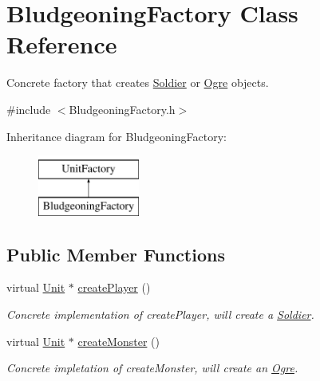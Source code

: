 \hypertarget{class_bludgeoning_factory}{}\section{Bludgeoning\+Factory Class Reference}
\label{class_bludgeoning_factory}


Concrete factory that creates \hyperlink{class_soldier}{Soldier} or \hyperlink{class_ogre}{Ogre} objects.  




{\ttfamily \#include $<$Bludgeoning\+Factory.\+h$>$}

Inheritance diagram for Bludgeoning\+Factory\+:\begin{figure}[H]
\begin{center}
\leavevmode
\includegraphics[height=2.000000cm]{class_bludgeoning_factory}
\end{center}
\end{figure}
\subsection*{Public Member Functions}
\begin{DoxyCompactItemize}
\item 
\hypertarget{class_bludgeoning_factory_adb269785fcab1a468aabe771cf4f4336}{}virtual \hyperlink{class_unit}{Unit} $\ast$ \hyperlink{class_bludgeoning_factory_adb269785fcab1a468aabe771cf4f4336}{create\+Player} ()\label{class_bludgeoning_factory_adb269785fcab1a468aabe771cf4f4336}

\begin{DoxyCompactList}\small\item\em Concrete implementation of create\+Player, will create a \hyperlink{class_soldier}{Soldier}. \end{DoxyCompactList}\item 
\hypertarget{class_bludgeoning_factory_aac731068b267c290aa7d0b3968cf7d1d}{}virtual \hyperlink{class_unit}{Unit} $\ast$ \hyperlink{class_bludgeoning_factory_aac731068b267c290aa7d0b3968cf7d1d}{create\+Monster} ()\label{class_bludgeoning_factory_aac731068b267c290aa7d0b3968cf7d1d}

\begin{DoxyCompactList}\small\item\em Concrete impletation of create\+Monster, will create an \hyperlink{class_ogre}{Ogre}. \end{DoxyCompactList}\end{DoxyCompactItemize}
